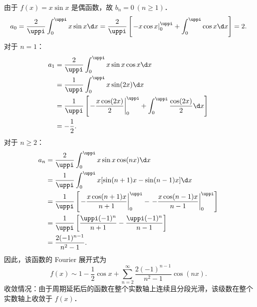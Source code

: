 \begin{solution}
    由于 $f(x) = x \sin x$ 是偶函数，故 $b_n = 0 \ (n \geqslant 1)$．
    \begin{equation}\label{eq:xsinx-a0}
        a_0 = \frac{2}{\uppi} \int_{0}^{\uppi} x \sin x \d x = \frac{2}{\uppi} \left[ \left. -x \cos x \right|_{0}^{\uppi} + \int_{0}^{\uppi} \cos x \d x \right] = 2.
    \end{equation}
    对于 $n = 1$：
    \begin{equation}\label{eq:xsinx-a1}
        \begin{aligned}
            a_1 & = \frac{2}{\uppi} \int_{0}^{\uppi} x \sin x \cos x \d x                                                                      \\
                & = \frac{1}{\uppi} \int_{0}^{\uppi} x \sin(2x) \d x                                                                           \\
                & = \frac{1}{\uppi} \left[ \left. -\frac{x \cos(2x)}{2} \right|_{0}^{\uppi} + \int_{0}^{\uppi} \frac{\cos(2x)}{2} \d x \right] \\
                & = -\frac{1}{2}.
        \end{aligned}
    \end{equation}
    对于 $n \geqslant 2$：
    \begin{equation}\label{eq:xsinx-an}
        \begin{aligned}
            a_n & = \frac{2}{\uppi} \int_{0}^{\uppi} x \sin x \cos(nx) \d x                                                                                    \\
                & = \frac{1}{\uppi} \int_{0}^{\uppi} x [ \sin(n+1)x - \sin(n-1)x ] \d x                                                                        \\
                & = \frac{1}{\uppi} \left[ \left. -\frac{x \cos(n+1)x}{n+1} \right|_{0}^{\uppi} - \left. -\frac{x \cos(n-1)x}{n-1} \right|_{0}^{\uppi} \right] \\
                & = \frac{1}{\uppi} \left[ \frac{\uppi (-1)^n}{n+1} - \frac{\uppi (-1)^n}{n-1} \right]                                                         \\
                & = \frac{2(-1)^{n-1}}{n^2 - 1}.
        \end{aligned}
    \end{equation}
    因此，该函数的 Fourier 展开式为
    \begin{equation}
        \boxed{f(x) \sim 1 - \frac{1}{2} \cos x + \sum_{n=2}^{\infty} \frac{2(-1)^{n-1}}{n^2 - 1} \cos(nx)}.
    \end{equation}
    收敛情况：由于周期延拓后的函数在整个实数轴上连续且分段光滑，该级数在整个实数轴上收敛于 $f(x)$．
\end{solution}

